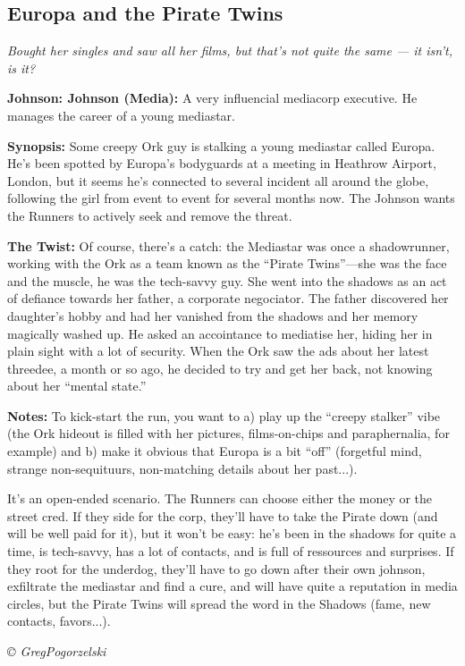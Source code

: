 \documentclass[letterpaper,onecolumn,10pt]{article}
\renewcommand{\textsc}[1]{{\fontspec{Friz Quadrata SC TT}\selectfont #1}}
\newcommand{\getyear}[1]{\StrLeft{#1}{4}}
\newenvironment{scenario}[6]
	{
		\section[#1 {\small\textsc{[#2]}}]{#1} \nopagebreak

		\noindent{\textsc{#2}}\nopagebreak

		\noindent\textit{#3}\nopagebreak
		\def\TMPSCENARIO{{\small\textit{©\getyear{#5}{} #4}}}
	}
	{\TMPSCENARIO}
\newcommand{\johnson}[2]{\textbf{Johnson: #1 (#2):}}
\newcommand{\synopsis}{\textbf{Synopsis: }}
\newcommand{\notes}{\textbf{Notes: }}
\newcommand{\twist}{\textbf{The Twist: }}
\begin{document}
\begin{multicols}{2}
\begin{scenario}{Europa and the Pirate Twins}
	{Investigation; Social}
	{Bought her singles and saw all her films, but that's not quite the same --- it isn't, is it?}
	{GregPogorzelski}
	{2007-04-16}
	{https://forum.rpg.net/showthread.php?321504-Shadowrun-4th-101-Instant-Scenarios\&p=7177053#post7177053}

\johnson{Johnson}{Media}  
A very influencial mediacorp executive. He manages the career of a young mediastar.

\synopsis Some creepy Ork guy is stalking a young mediastar called Europa. He's been spotted by Europa's bodyguards at a meeting in Heathrow Airport, London, but it seems he's connected to several incident all around the globe, following the girl from event to event for several months now. The Johnson wants the Runners to actively seek and remove the threat.

\twist Of course, there's a catch: the Mediastar was once a shadowrunner, working with the Ork as a team known as the ``Pirate Twins''---she was the face and the muscle, he was the tech-savvy guy. She went into the shadows as an act of defiance towards her father, a corporate negociator. The father discovered her daughter's hobby and had her vanished from the shadows and her memory magically washed up. He asked an accointance to mediatise her, hiding her in plain sight with a lot of security. When the Ork saw the ads about her latest threedee, a month or so ago, he decided to try and get her back, not knowing about her ``mental state.''

\notes To kick-start the run, you want to a) play up the ``creepy stalker'' vibe (the Ork hideout is filled with her pictures, films-on-chips and paraphernalia, for example) and b) make it obvious that Europa is a bit ``off'' (forgetful mind, strange non-sequituurs, non-matching details about her past...).

It's an open-ended scenario. The Runners can choose either the money or the street cred. If they side for the corp, they'll have to take the Pirate down (and will be well paid for it), but it won't be easy: he's been in the shadows for quite a time, is tech-savvy, has a lot of contacts, and is full of ressources and surprises. If they root for the underdog, they'll have to go down after their own johnson, exfiltrate the mediastar and find a cure, and will have quite a reputation in media circles, but the Pirate Twins will spread the word in the Shadows (fame, new contacts, favors...). 


\end{scenario}
\end{multicols}
\end{document}
